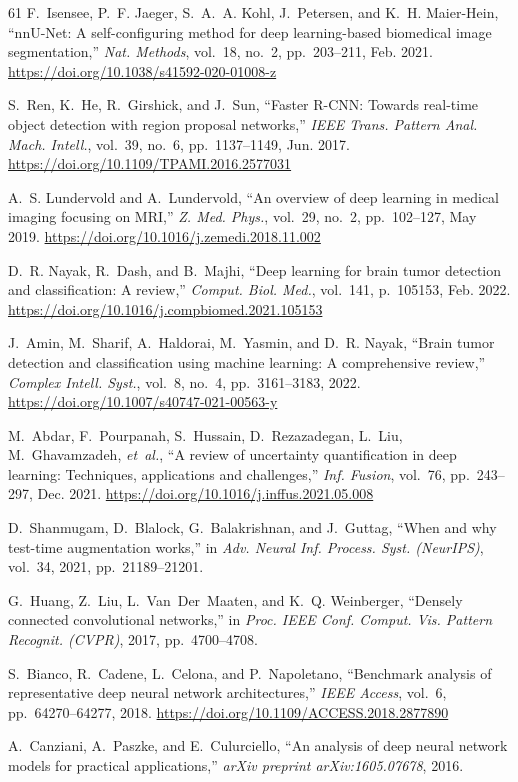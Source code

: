 ﻿\documentclass[journal]{IEEEtran}
\providecommand{\doi}[1]{\url{https://doi.org/#1}}
\begin{document}
\begin{thebibliography}{61}
F.~Isensee, P.~F. Jaeger, S.~A.~A. Kohl, J.~Petersen, and K.~H. Maier-Hein, ``nnU-Net: A self-configuring method for deep learning-based biomedical image segmentation,'' \emph{Nat. Methods}, vol.~18, no.~2, pp.~203--211, Feb. 2021. \doi{10.1038/s41592-020-01008-z}

S.~Ren, K.~He, R.~Girshick, and J.~Sun, ``Faster R-CNN: Towards real-time object detection with region proposal networks,'' \emph{IEEE Trans. Pattern Anal. Mach. Intell.}, vol.~39, no.~6, pp.~1137--1149, Jun. 2017. \doi{10.1109/TPAMI.2016.2577031}

A.~S. Lundervold and A.~Lundervold, ``An overview of deep learning in medical imaging focusing on MRI,'' \emph{Z. Med. Phys.}, vol.~29, no.~2, pp.~102--127, May 2019. \doi{10.1016/j.zemedi.2018.11.002}

D.~R. Nayak, R.~Dash, and B.~Majhi, ``Deep learning for brain tumor detection and classification: A review,'' \emph{Comput. Biol. Med.}, vol.~141, p.~105153, Feb. 2022. \doi{10.1016/j.compbiomed.2021.105153}

J.~Amin, M.~Sharif, A.~Haldorai, M.~Yasmin, and D.~R. Nayak, ``Brain tumor detection and classification using machine learning: A comprehensive review,'' \emph{Complex Intell. Syst.}, vol.~8, no.~4, pp.~3161--3183, 2022. \doi{10.1007/s40747-021-00563-y}

M.~Abdar, F.~Pourpanah, S.~Hussain, D.~Rezazadegan, L.~Liu, M.~Ghavamzadeh, \emph{et~al.}, ``A review of uncertainty quantification in deep learning: Techniques, applications and challenges,'' \emph{Inf. Fusion}, vol.~76, pp.~243--297, Dec. 2021. \doi{10.1016/j.inffus.2021.05.008}

D.~Shanmugam, D.~Blalock, G.~Balakrishnan, and J.~Guttag, ``When and why test-time augmentation works,'' in \emph{Adv. Neural Inf. Process. Syst. (NeurIPS)}, vol.~34, 2021, pp.~21189--21201.

G.~Huang, Z.~Liu, L.~Van~Der~Maaten, and K.~Q. Weinberger, ``Densely connected convolutional networks,'' in \emph{Proc. IEEE Conf. Comput. Vis. Pattern Recognit. (CVPR)}, 2017, pp.~4700--4708.

S.~Bianco, R.~Cadene, L.~Celona, and P.~Napoletano, ``Benchmark analysis of representative deep neural network architectures,'' \emph{IEEE Access}, vol.~6, pp.~64270--64277, 2018. \doi{10.1109/ACCESS.2018.2877890}

A.~Canziani, A.~Paszke, and E.~Culurciello, ``An analysis of deep neural network models for practical applications,'' \emph{arXiv preprint arXiv:1605.07678}, 2016.

\end{thebibliography}
\end{document}

